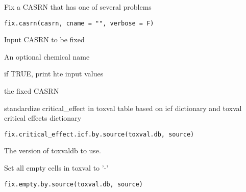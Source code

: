 \documentclass[letterpaper]{book}
\begin{document}
%
\begin{Description}\relax
Fix a CASRN that has one of several problems
\end{Description}
%
\begin{Usage}
\begin{verbatim}
fix.casrn(casrn, cname = "", verbose = F)
\end{verbatim}
\end{Usage}
%
\begin{Arguments}
\begin{ldescription}
\item[\code{casrn}] Input CASRN to be fixed

\item[\code{cname}] An optional chemical name

\item[\code{verbose}] if TRUE, print hte input values
\end{ldescription}
\end{Arguments}
%
\begin{Value}
the fixed CASRN
\end{Value}
%
\begin{Description}\relax
standardize critical\_effect in toxval table based on icf dictionary and toxval critical effects dictionary
\end{Description}
%
\begin{Usage}
\begin{verbatim}
fix.critical_effect.icf.by.source(toxval.db, source)
\end{verbatim}
\end{Usage}
%
\begin{Arguments}
\begin{ldescription}
\item[\code{toxval.db}] The version of toxvaldb to use.
\end{ldescription}
\end{Arguments}
%
\begin{Description}\relax
Set all empty cells in toxval to '-'
\end{Description}
%
\begin{Usage}
\begin{verbatim}
fix.empty.by.source(toxval.db, source)
\end{verbatim}
\end{Usage}
\end{document}
